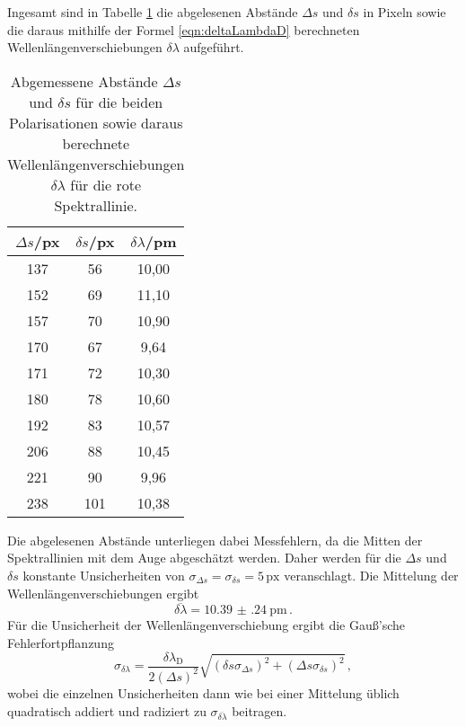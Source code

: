 Ingesamt sind in Tabelle \ref{tab:rot} die abgelesenen Abstände $\Delta s$ und $\delta s$ in Pixeln sowie die daraus mithilfe der Formel \eqref{eqn:deltaLambdaD} berechneten Wellenlängenverschiebungen $\delta \lambda$ aufgeführt.

\begin{table}[htp]
	\begin{center}
    \caption{Abgemessene Abstände $\Delta s$ und $\delta s$ für die beiden Polarisationen sowie daraus berechnete Wellenlängenverschiebungen $\delta \lambda$ für die rote Spektrallinie.}
    \label{tab:rot}
		\begin{tabular}{ccc}
		\toprule
			{$\Delta s$/px} & {$\delta s$/px} & {$\delta \lambda$/pm}\\
			\midrule
			137 &  56 & 10,00\\
			152 &  69 & 11,10\\
			157 &  70 & 10,90\\
			170 &  67 &  9,64\\
			171 &  72 & 10,30\\
			180 &  78 & 10,60\\
			192 &  83 & 10,57\\
			206 &  88 & 10,45\\
			221 &  90 &  9,96\\
			238 & 101 & 10,38\\
		\bottomrule
		\end{tabular}
	\end{center}
\end{table}

Die abgelesenen Abstände unterliegen dabei Messfehlern, da die Mitten der Spektrallinien mit dem Auge abgeschätzt werden. Daher werden für die $\Delta s$ und $\delta s$ konstante Unsicherheiten von $\sigma_{\Delta s} = \sigma_{\delta s}= 5\,\text{px}$ veranschlagt.
Die Mittelung der Wellenlängenverschiebungen ergibt
\begin{equation*}
  \overline{\delta \lambda} = \SI{10.39(24)}{\pico\meter}\,.
\end{equation*}
Für die Unsicherheit der Wellenlängenverschiebung ergibt die Gauß'sche Fehlerfortpflanzung
\begin{equation}
  \sigma_{\delta \lambda} = \frac{\delta \lambda_\text{D}}{2(\Delta s)^2} \sqrt{(\delta s \sigma_{\Delta s})^2 + (\Delta s \sigma_{\delta s})^2}\,,
\end{equation}
wobei die einzelnen Unsicherheiten dann wie bei einer Mittelung üblich quadratisch addiert und radiziert zu $\sigma_{\overline{\delta \lambda}}$ beitragen.

